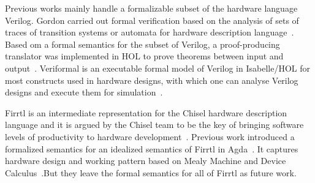 Previous works mainly handle a formalizable subset of the hardware language Verilog. Gordon carried out formal verification based on the analysis of sets of traces of transition systems or automata for hardware description language~\cite{Gordon02}. Based om a formal semantics for the subset of Verilog, a proof-producing translator was implemented in HOL to prove theorems between input and output~\cite{Lööw19}. Veriformal is an executable formal model of Verilog in Isabelle/HOL for most constructs used in hardware designs, with which one can analyse Verilog designs and execute them for simulation~\cite{Khan17}.

Firrtl is an intermediate representation for the Chisel hardware description language and it is argued by the Chisel team to be the key of bringing software levels of productivity to hardware development~\cite{firrtl-spec}. Previous work introduced a formalized semantics for an idealized semantics of Firrtl in Agda~\cite{HarrisonHA21}. It captures hardware design and working pattern based on Mealy Machine and Device Calculus~\cite{Harrison20}.But they leave the formal semantics for all of Firrtl as future work.